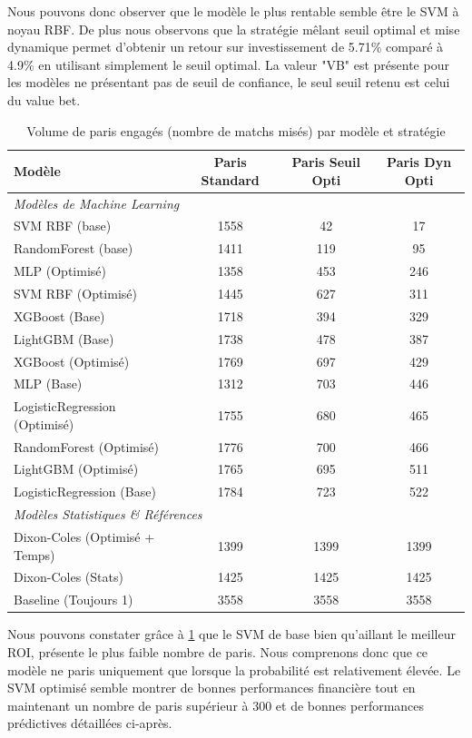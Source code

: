 \noindent Nous pouvons donc observer que le modèle le plus rentable semble être le 
SVM à noyau RBF. De plus nous observons que la stratégie mêlant seuil optimal et 
mise dynamique permet d'obtenir un retour sur investissement de 5.71\% comparé 
à 4.9\% en utilisant simplement le seuil optimal. La valeur "VB" est présente pour les modèles 
ne présentant pas de seuil de confiance, le seul seuil retenu est celui du value bet.

\begin{table}[H]
\centering
\caption{Volume de paris engagés (nombre de matchs misés) par modèle et stratégie}
\label{tab:volume_paris}
\begin{tabular}{l|c|c|c}
\hline
\textbf{Modèle} & \textbf{Paris Standard} & \textbf{Paris Seuil Opti} & \textbf{Paris Dyn Opti} \\
\hline
\hline
\multicolumn{4}{l}{\textit{Modèles de Machine Learning}} \\
\hline
SVM RBF (base) & 1558 & 42 & 17 \\
RandomForest (base) & 1411 & 119 & 95 \\
MLP (Optimisé) & 1358 & 453 & 246 \\
SVM RBF (Optimisé) & 1445 & 627 & 311 \\
XGBoost (Base) & 1718 & 394 & 329 \\
LightGBM (Base) & 1738 & 478 & 387 \\
XGBoost (Optimisé) & 1769 & 697 & 429 \\
MLP (Base) & 1312 & 703 & 446 \\
LogisticRegression (Optimisé) & 1755 & 680 & 465 \\
RandomForest (Optimisé) & 1776 & 700 & 466 \\
LightGBM (Optimisé) & 1765 & 695 & 511 \\
LogisticRegression (Base) & 1784 & 723 & 522 \\
\hline
\hline
\multicolumn{4}{l}{\textit{Modèles Statistiques \& Références}} \\
\hline
Dixon-Coles (Optimisé + Temps) & 1399 & 1399 & 1399 \\
Dixon-Coles (Stats) & 1425 & 1425 & 1425 \\
Baseline (Toujours 1) & 3558 & 3558 & 3558 \\
\hline
\end{tabular}
\end{table}
Nous pouvons constater grâce à \ref{tab:volume_paris} que le SVM de base bien qu'aillant le 
meilleur ROI, présente le plus faible nombre de paris. Nous comprenons donc que ce modèle ne 
paris uniquement que lorsque la probabilité est relativement élevée. Le SVM optimisé semble 
montrer de bonnes performances financière tout en maintenant un nombre de paris supérieur 
à 300 et de bonnes performances prédictives détaillées ci-après.




